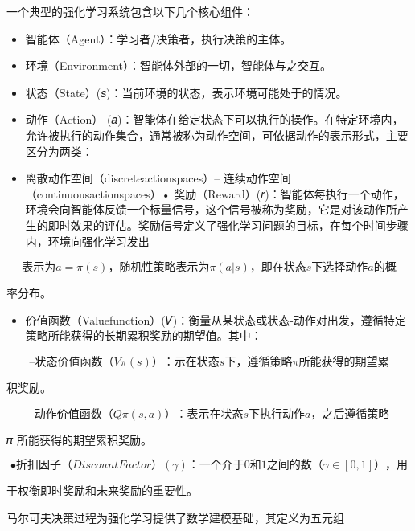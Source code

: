 \documentclass[12pt,a4paper,openright,UTF8]{ctexbook}
\begin{document}
一个典型的强化学习系统包含以下几个核心组件：

\begin{itemize}
\item 智能体（Agent）：学习者/决策者，执行决策的主体。
\item 环境（Environment）：智能体外部的一切，智能体与之交互。
\item 状态（State）(𝑠)：当前环境的状态，表示环境可能处于的情况。
\item 动作（Action） (𝑎)：智能体在给定状态下可以执行的操作。在特定环境内，允许被执行的动作集合，通常被称为动作空间，可依据动作的表示形式，主要区分为两类：
\item 离散动作空间（discreteactionspaces）– 连续动作空间（continuousactionspaces）• 奖励（Reward）(𝑟)：智能体每执行一个动作，环境会向智能体反馈一个标量信号，这个信号被称为奖励，它是对该动作所产生的即时效果的评估。奖励信号定义了强化学习问题的目标，在每个时间步骤内，环境向强化学习发出
\end{itemize}

\begin{equation}
表示为 a = \pi(s)，随机性策略表示为 \pi(a|s)，即在状态 s 下选择动作 a 的概
\end{equation}

率分布。

\begin{itemize}
\item 价值函数（Valuefunction）(𝑉)：衡量从某状态或状态-动作对出发，遵循特定策略所能获得的长期累积奖励的期望值。其中：
\end{itemize}

\begin{equation}
– 状态价值函数（V\pi(s)）：示在状态s下，遵循策略\pi 所能获得的期望累
\end{equation}

积奖励。

\begin{equation}
– 动作价值函数（Q\pi(s,a)）：表示在状态s下执行动作a，之后遵循策略
\end{equation}

𝜋 所能获得的期望累积奖励。

\begin{equation}
• 折扣因子（DiscountFactor）(\gamma)：一个介于0和1之间的数（\gamma \in [0,1]），用
\end{equation}

于权衡即时奖励和未来奖励的重要性。


马尔可夫决策过程为强化学习提供了数学建模基础，其定义为五元组
\end{document}
